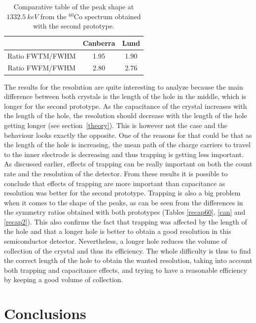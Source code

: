 \documentclass[11pt,a4paper]{article}
\begin{document}
\begin{table}[!h]
\centering
\caption{Comparative table of the peak shape at $1332.5~keV$ from the $^{60}$Co spectrum obtained with the second prototype.}
\label{shape2}
\begin{tabular}{c|c|c|}
\cline{2-3}
                                      & Canberra & Lund \\ \hline
\multicolumn{1}{|c|}{Ratio FWTM/FWHM} & 1.95     & 1.90 \\ \hline
\multicolumn{1}{|c|}{Ratio FWFM/FWHM} & 2.80     & 2.76 \\ \hline
\end{tabular}
\end{table}

The results for the resolution are quite interesting to analyze because the main difference between both crystals is the length of the hole in the middle, which is longer for the second prototype. As the capacitance of the crystal increases with the length of the hole, the resolution should decrease with the length of the hole getting longer (see section~\ref{theory}). This is however not the case and the behaviour looks exactly the opposite. One of the reasons for that could be that as the length of the hole is increasing, the mean path of the charge carriers to travel to the inner electrode is decreasing and thus trapping is getting less important. As discussed earlier, effects of trapping can be really important on both the count rate and the resolution of the detector. From these results it is possible to conclude that effects of trapping are more important than capacitance as resolution was better for the second prototype. Trapping is also a big problem when it comes to the shape of the peaks, as can be seen from the differences in the symmetry ratios obtained with both prototypes (Tables \ref{recap60}, \ref{can} and \ref{recap2}). This also confirms the fact that trapping was affected by the length of the hole and that a longer hole is better to obtain a good resolution in this semiconductor detector. Nevertheless, a longer hole reduces the volume of collection of the crystal and thus its efficiency. The whole difficulty is thus to find the correct length of the hole to obtain the wanted resolution, taking into account both trapping and capacitance effects, and trying to have a reasonable efficiency by keeping a good volume of collection.

\newpage

\section{Conclusions}
\end{document}
